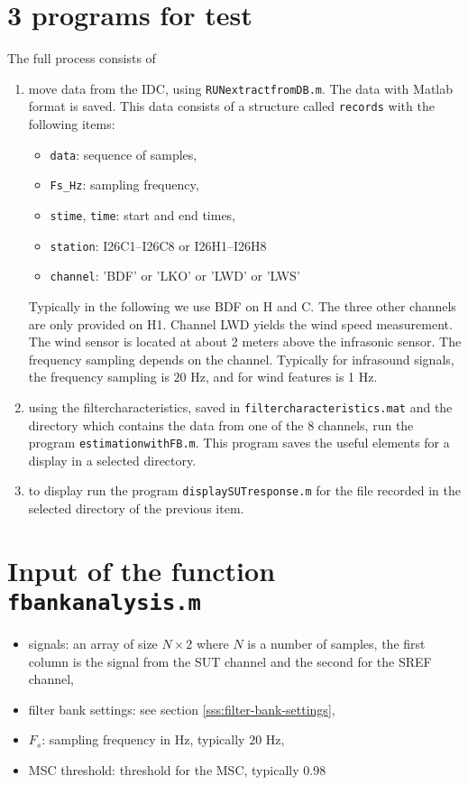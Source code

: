 

\section{3 programs for test}
The full process consists of
\begin{enumerate}
\item
 move data from the IDC, using {\tt RUNextractfromDB.m}. The data with Matlab format is saved. This data consists of a structure called {\tt records} with the following items:
 \begin{itemize}
 \item
{\tt data}: sequence of samples,
 \item
{\tt Fs\_Hz}: sampling frequency,
\item
{\tt stime}, {\tt time}: start and end times, 
\item
{\tt station}: I26C1--I26C8 or I26H1--I26H8
\item
{\tt channel}: 'BDF' or 'LKO' or 'LWD' or 'LWS'
 \end{itemize}   
Typically in the following we use BDF on H and C.   The three other channels are only provided on H1. Channel LWD yields  the wind speed measurement. The wind sensor is located at about 2 meters above the infrasonic sensor. The frequency sampling depends on the channel. Typically for infrasound signals, the frequency sampling is $20$ Hz, and for wind features is 1 Hz.
    
\item
 using the filtercharacteristics, saved in {\tt filtercharacteristics.mat} and the directory which contains the data from one of the 8 channels, run the program {\tt estimationwithFB.m}. This program saves the useful elements for a display in a selected directory.
 \item
 to display run the program {\tt displaySUTresponse.m} for the file recorded in the selected directory of the previous item.
\end{enumerate}


\section{Input of the function {\tt fbankanalysis.m}}
\begin{itemize}
\item
signals: an array of size $N\times 2$ where $N$ is a number of samples, the first column is the signal from the SUT channel and the second for the SREF channel,
\item
filter bank settings: see section \ref{sss:filter-bank-settings},
\item
$F_s$: sampling frequency in Hz, typically $20$ Hz,
\item
MSC threshold: threshold for the MSC, typically $0.98$
\end{itemize}
